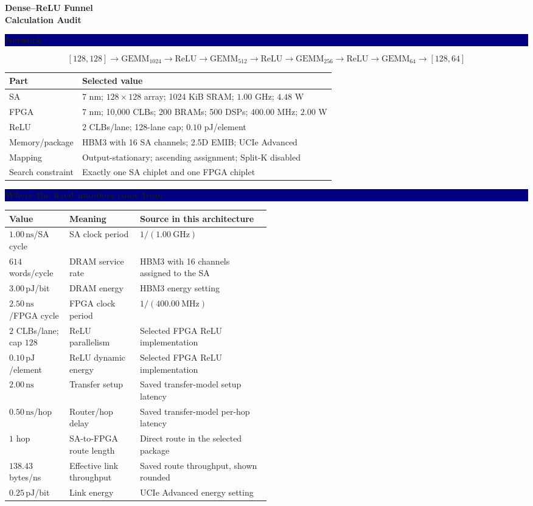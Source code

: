 \documentclass[10pt]{article}
\newcommand{\ns}{\,\mathrm{ns}}
\newcommand{\pj}{\,\mathrm{pJ}}
\newcommand{\sectionbar}[1]{\vspace{0.5em}\noindent
  \colorbox{navy}{\parbox{\dimexpr\linewidth-2\fboxsep\relax}{
  \color{white}\large\bfseries #1}}\par\vspace{0.35em}}
\begin{document}
\begin{center}
{\color{navy}\LARGE\bfseries Dense--ReLU Funnel\\[0.2em]Calculation Audit}\par
\end{center}

\sectionbar{Network}
\[
[128,128]\rightarrow \mathrm{GEMM}_{1024}\rightarrow\mathrm{ReLU}
\rightarrow\mathrm{GEMM}_{512}\rightarrow\mathrm{ReLU}
\rightarrow\mathrm{GEMM}_{256}\rightarrow\mathrm{ReLU}
\rightarrow\mathrm{GEMM}_{64}\rightarrow[128,64]
\]
\begin{tabularx}{\linewidth}{@{}L Y@{}}
\toprule
\textbf{Part} & \textbf{Selected value} \\
\midrule
SA & 7 nm; $128\times128$ array; 1024 KiB SRAM; $1.00$ GHz; $4.48$ W \\
FPGA & 7 nm; 10,000 CLBs; 200 BRAMs; 500 DSPs; $400.00$ MHz; $2.00$ W \\
ReLU & 2 CLBs/lane; 128-lane cap; $0.10$ pJ/element \\
Memory/package & HBM3 with 16 SA channels; 2.5D EMIB; UCIe Advanced \\
Mapping & Output-stationary; ascending assignment; Split-K disabled \\
Search constraint & Exactly one SA chiplet and one FPGA chiplet \\
\bottomrule
\end{tabularx}

\sectionbar{Where the fixed numbers come from}
\begin{tabularx}{\linewidth}{@{}p{0.23\linewidth}p{0.27\linewidth}Y@{}}
\toprule
\textbf{Value} & \textbf{Meaning} & \textbf{Source in this architecture} \\
\midrule
$1.00\ns$/SA cycle & SA clock period & $1/(1.00\ \mathrm{GHz})$ \\
$614$ words/cycle & DRAM service rate & HBM3 with 16 channels assigned to the SA \\
$3.00\pj$/bit & DRAM energy & HBM3 energy setting \\
$2.50\ns$/FPGA cycle & FPGA clock period & $1/(400.00\ \mathrm{MHz})$ \\
$2$ CLBs/lane; cap $128$ & ReLU parallelism & Selected FPGA ReLU implementation \\
$0.10\pj$/element & ReLU dynamic energy & Selected FPGA ReLU implementation \\
$2.00\ns$ & Transfer setup & Saved transfer-model setup latency \\
$0.50\ns$/hop & Router/hop delay & Saved transfer-model per-hop latency \\
$1$ hop & SA-to-FPGA route length & Direct route in the selected package \\
$138.43$ bytes/ns & Effective link throughput & Saved route throughput, shown rounded \\
$0.25\pj$/bit & Link energy & UCIe Advanced energy setting \\
\bottomrule
\end{tabularx}
\end{document}
